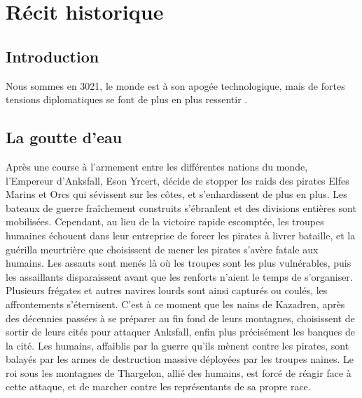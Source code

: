\section{Récit historique}
\subsection{Introduction}
Nous sommes en 3021, le monde est à son apogée technologique, mais de fortes tensions diplomatiques se font de plus en plus ressentir .
\subsection{La goutte d'eau}
Après une course à l'armement entre les différentes nations du monde, l'Empereur d'Anksfall, Eson Yrcert, décide de stopper les raids des pirates Elfes Marins et Orcs qui sévissent sur les côtes, et s'enhardissent de plus en plus. Les bateaux de guerre fraîchement construits s'ébranlent et des divisions entières sont mobilisées. Cependant, au lieu de la victoire rapide escomptée, les troupes humaines échouent dans leur entreprise de forcer les pirates à livrer bataille, et la guérilla meurtrière que choisissent de mener les pirates s'avère fatale aux humains. Les assauts sont menés là où les troupes sont les plus vulnérables, puis les assaillants disparaissent avant que les renforts n'aient le temps de s'organiser. Plusieurs frégates et autres navires lourds sont ainsi capturés ou coulés, les affrontements s'éternisent. C'est à ce moment que les nains de Kazadren, après des décennies passées à se préparer au fin fond de leurs montagnes, choisissent de sortir de leurs cités pour attaquer Anksfall, enfin plus précisément les banques de la cité. Les humains, affaiblis par la guerre qu'ils mènent contre les pirates, sont balayés par les armes de destruction massive déployées par les troupes naines. Le roi sous les montagnes de Thargelon, allié des humains, est forcé de réagir face à cette attaque, et de marcher contre les représentants de sa propre race. 
